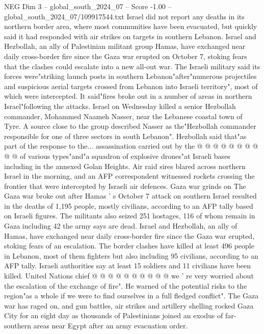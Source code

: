 \begin{textsample}{NEG Dim 3 – global\_south\_2024\_07 – Score -1.00 – global\_south\_2024\_07/109917544.txt}  \label{ex:f3_neg_145}
Israel did not report any deaths in its northern border area, where most communities have been evacuated, but quickly said it had responded with air strikes on targets in southern Lebanon.
Israel and Hezbollah, an ally of Palestinian militant group Hamas, have exchanged near daily cross-border fire since the Gaza war erupted on October 7, stoking fears that the clashes could escalate into a new all-out war.
The Israeli military said its forces were"striking launch posts in southern Lebanon"after"numerous projectiles and suspicious aerial targets crossed from Lebanon into Israeli territory", most of which were intercepted.
It said"fires broke out in a number of areas in northern Israel"following the attacks.
Israel on Wednesday killed a senior Hezbollah commander, Mohammed Naameh Nasser, near the Lebanese coastal town of Tyre.
A source close to the group described Nasser as the"Hezbollah commander responsible for one of three sectors in south Lebanon".
Hezbollah said that"as part of the response to the... assassination carried out by the @ @ @ @ @ @ @ @ @ @ of various types"and"a squadron of explosive drones"at Israeli bases including in the annexed Golan Heights.
Air raid sires blared across northern Israel in the morning, and an AFP correspondent witnessed rockets crossing the frontier that were intercepted by Israeli air defences.
Gaza war grinds on The Gaza war broke out after Hamas ' s October 7 attack on southern Israel resulted in the deaths of 1,195 people, mostly civilians, according to an AFP tally based on Israeli figures.
The militants also seized 251 hostages, 116 of whom remain in Gaza including 42 the army says are dead.
Israel and Hezbollah, an ally of Hamas, have exchanged near daily cross-border fire since the Gaza war erupted, stoking fears of an escalation.
The border clashes have killed at least 496 people in Lebanon, most of them fighters but also including 95 civilians, according to an AFP tally.
Israeli authorities say at least 15 soldiers and 11 civilians have been killed.
United Nations chief @ @ @ @ @ @ @ @ @ @ we ' re very worried about the escalation of the exchange of fire".
He warned of the potential risks to the region"as a whole if we were to find ourselves in a full fledged conflict".
The Gaza war has raged on, and gun battles, air strikes and artillery shelling rocked Gaza City for an eight day as thousands of Palestinians joined an exodus of far-southern areas near Egypt after an army evacuation order.

\end{textsample}
